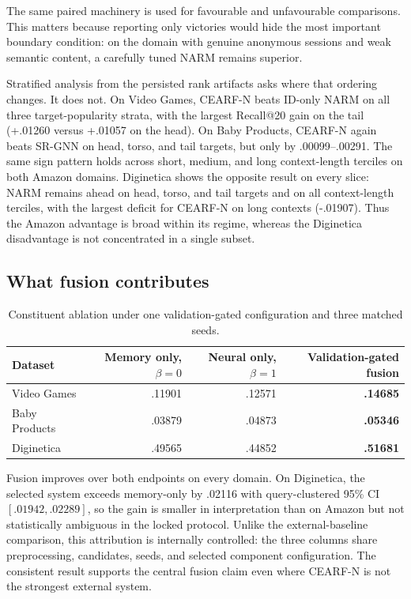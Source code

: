 \documentclass[runningheads]{llncs}
\newcommand{\method}{CEARF-N}
\begin{document}
The same paired machinery is used for favourable and unfavourable comparisons.
This matters because reporting only victories would hide the most important
boundary condition: on the domain with genuine anonymous sessions and weak
semantic content, a carefully tuned NARM remains superior.

Stratified analysis from the persisted rank artifacts asks where that ordering
changes. It does not. On Video Games, \method{} beats ID-only NARM on all
three target-popularity strata, with the largest Recall@20 gain on the tail
(+.01260 versus +.01057 on the head). On Baby Products, \method{} again beats
SR-GNN on head, torso, and tail targets, but only by .00099--.00291. The same
sign pattern holds across short, medium, and long context-length terciles on
both Amazon domains. Diginetica shows the opposite result on every slice:
NARM remains ahead on head, torso, and tail targets and on all context-length
terciles, with the largest deficit for \method{} on long contexts (-.01907).
Thus the Amazon advantage is broad within its regime, whereas the Diginetica
disadvantage is not concentrated in a single subset.

\subsection{What fusion contributes}
\begin{table}[t]
\caption{Constituent ablation under one validation-gated configuration and
three matched seeds.}
\label{tab:constituents}\centering\small
\begin{tabular}{lrrr}
\toprule Dataset & Memory only, $\beta=0$ & Neural only, $\beta=1$ & Validation-gated fusion \\
\midrule
Video Games & .11901 & .12571 & \textbf{.14685} \\
Baby Products & .03879 & .04873 & \textbf{.05346} \\
Diginetica & .49565 & .44852 & \textbf{.51681} \\
\bottomrule
\end{tabular}
\end{table}

Fusion improves over both endpoints on every domain. On Diginetica, the
selected system exceeds memory-only by .02116 with query-clustered 95\% CI
$[.01942,.02289]$, so the gain is smaller in interpretation than on Amazon but
not statistically ambiguous in the locked protocol. Unlike the
external-baseline comparison, this attribution is internally controlled: the
three columns share preprocessing, candidates, seeds, and selected component
configuration. The consistent result supports the central fusion claim even
where \method{} is not the strongest external system.
\end{document}
